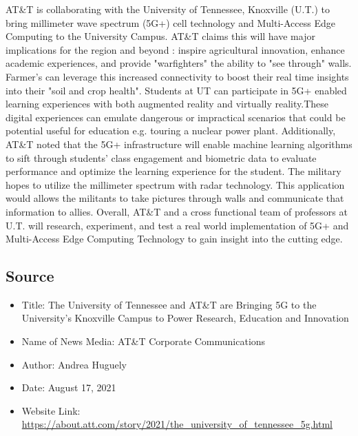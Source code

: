 \documentclass{article}
\begin{document}
AT\&T is collaborating with the University of Tennessee, Knoxville (U.T.) to bring millimeter wave spectrum
(5G+) cell technology and Multi-Access Edge Computing to the University Campus. AT\&T claims this will have major 
implications for the region and beyond : inspire agricultural innovation, enhance academic experiences, and provide "warfighters"
the ability to "see through" walls. Farmer's can leverage this increased connectivity to boost 
their real time insights into their "soil and crop health".
Students at UT  can participate in 5G+ enabled learning experiences with both
augmented reality and virtually reality.These digital experiences 
can emulate dangerous or impractical scenarios that could be potential useful
for education e.g. touring a nuclear power plant.  
Additionally, AT\&T noted that the 5G+ infrastructure
will enable machine learning algorithms to sift through students' class engagement and biometric data to evaluate performance and optimize the learning experience for the student.
The military hopes to utilize the millimeter spectrum with radar technology. This application would allows the militants to take pictures through walls and communicate
that information to allies. Overall,
AT\&T and a cross functional team of professors at U.T.
will research, experiment, and test a real world implementation of
5G+ and Multi-Access Edge Computing Technology to gain insight into the cutting edge.


\subsection*{Source}

\begin{itemize}
  \item Title: The University of Tennessee and AT\&T are Bringing 5G to the
University’s Knoxville Campus to Power Research, Education and
Innovation
  \item Name of News Media: AT\&T Corporate Communications
  \item Author: Andrea Huguely
  \item Date: August 17, 2021
  \item Website Link: \url{https://about.att.com/story/2021/the_university_of_tennessee_5g.html}
\end{itemize}
\end{document}
